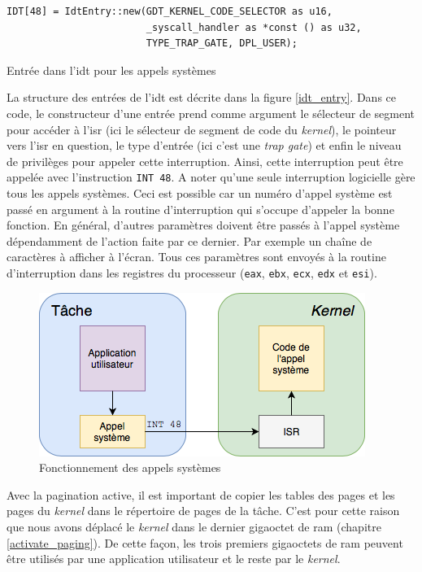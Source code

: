 \begin{code}
\begin{verbatim}
IDT[48] = IdtEntry::new(GDT_KERNEL_CODE_SELECTOR as u16,
                        _syscall_handler as *const () as u32,
                        TYPE_TRAP_GATE, DPL_USER);
\end{verbatim}
\caption{Entrée dans l'\acrshort{idt} pour les appels systèmes}
\label{lst:tasks:syscalls:idtentry}
\end{code} \medbreak

La structure des entrées de l'\acrshort{idt} est décrite dans la figure \ref{idt_entry}.
Dans ce code, le constructeur d'une entrée prend comme argument le sélecteur de
segment pour accéder à l'\acrshort{isr} (ici le sélecteur de segment de code du
\textit{kernel}), le pointeur vers l'\acrshort{isr} en question, le type d'entrée
(ici c'est une \textit{trap gate}) et enfin le niveau de privilèges pour appeler
cette interruption. Ainsi, cette interruption peut être appelée avec l'instruction
\texttt{INT 48}. A noter qu'une seule interruption logicielle gère tous
les appels systèmes. Ceci est possible car un numéro d'appel système est passé en
argument à la routine d'interruption qui s'occupe d'appeler la bonne fonction.
En général, d'autres paramètres doivent être passés à l'appel système dépendamment
de l'action faite par ce dernier. Par exemple un chaîne de caractères à afficher
à l'écran. Tous ces paramètres sont envoyés à la routine d'interruption dans les
registres du processeur (\texttt{eax}, \texttt{ebx}, \texttt{ecx},
\texttt{edx} et \texttt{esi}).

\begin{figure}[!h]
  \centering
  \includegraphics[scale=.7]{images/syscall.png}
  \caption{Fonctionnement des appels systèmes}
  \label{syscall}
\end{figure}

Avec la pagination active, il est important de copier les tables des pages et les
pages du \textit{kernel} dans le répertoire de pages de la tâche. C'est pour cette
raison que nous avons déplacé le \textit{kernel} dans le dernier gigaoctet de
\acrshort{ram} (chapitre \ref{activate_paging}). De cette façon, les trois premiers
gigaoctets de \acrshort{ram} peuvent être utilisés par une application utilisateur
et le reste par le \textit{kernel}.

